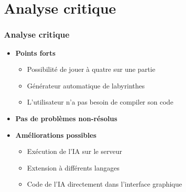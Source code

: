 \section{Analyse critique}

	\begin{frame}
		\frametitle{Analyse critique}

		\begin{itemize}
		\item \textbf{Points forts}
			\begin{itemize}
				\item Possibilité de jouer à quatre sur une partie
				\item Générateur automatique de labyrinthes
				\item L'utilisateur n'a pas besoin de compiler son code
			\end{itemize}
		\vspace{10px}
		\item \textbf{Pas de problèmes non-résolus}
		\vspace{10px}
		\item \textbf{Améliorations possibles}
			\begin{itemize}
				\item Exécution de l'IA sur le serveur
				\item Extension à différents langages
				\item Code de l'IA directement dans l'interface graphique
			\end{itemize}
		\end{itemize}
	\end{frame}

